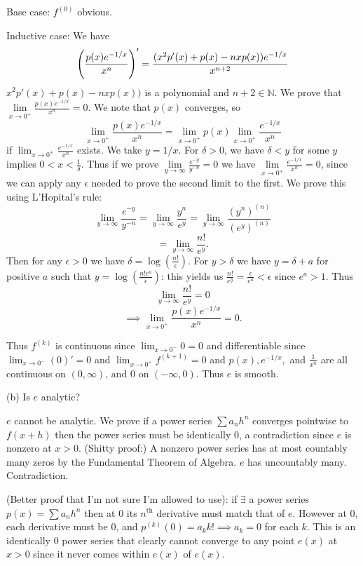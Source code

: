 \documentclass{amsart}
\begin{document}
\medskip \noindent Base case: $f^{(0)}$ obvious.

\medskip \noindent Inductive case: We have 
\[\Bigg{(}\frac{p(x)e^{-1/x}}{x^n}\Bigg{)}' = \frac{(x^2p'(x)+p(x)-nxp(x))e^{-1/x}}{x^{n+2}}\]
$x^2p'(x)+p(x)-nxp(x))$ is a polynomial and $n+2\in \mathbb{N}$. We prove that $\lim\limits_{x\rightarrow 0^+} \frac{p(x)e^{-1/x}}{x^n}=0$. 
We note that $p(x)$ converges, so \[\lim_{x\rightarrow 0^+} \frac{p(x)e^{-1/x}}{x^n}=\lim_{x\rightarrow 0^+}p(x)\lim_{x\rightarrow 0^+}\frac{e^{-1/x}}{x^n}\] if $\lim_{x\rightarrow 0^+}\frac{e^{-1/x}}{x^n}$ exists.
We take $y= 1/x$. For $\delta>0$, we have $\delta<y$ for some $y$ implies
$0<x<\frac{1}{\delta}$. Thus if we prove $\lim\limits_{y\rightarrow\infty}\frac{e^{-y}}{y^{-n}}=0$ we have
$\lim\limits_{x\rightarrow 0^+}\frac{e^{-1/x}}{x^n}=0$, since we can apply any $\epsilon$ needed to prove the second
limit to the first. We prove this using L'Hopital's rule:
\[\lim_{y\rightarrow\infty}\frac{e^{-y}}{y^{-n}}=\lim_{y\rightarrow\infty}\frac{y^n}{e^y}=\lim_{y\rightarrow\infty}\frac{(y^n)^{(n)}}{(e^y)^{(n)}}\]
\[=\lim_{y\rightarrow\infty}\frac{n!}{e^y}.\] Then for any $\epsilon>0$ we have $\delta =\log(\frac{n!}{\epsilon})$. For $y>\delta$ we have $y=\delta+a$ for
positive $a$ such that $y=\log(\frac{n!e^a}{\epsilon})$: this yields us $\frac{n!}{e^y}=\frac{\epsilon}{e^a}<\epsilon$ since $e^a>1$. Thus \[\lim_{y\rightarrow\infty}\frac{n!}{e^y}=0\]
\[\implies \lim_{x\rightarrow 0^+}\frac{p(x)e^{-1/x}}{x^n}=0.\]

\medskip \noindent Thus $f^{(k)}$ is continuous since $\lim_{x\rightarrow 0^-}0 =0$ and differentiable since
$\lim_{x\rightarrow 0^-} (0)'=0$ and $\lim_{x\rightarrow 0^+} f^{(k+1)}=0$ and $p(x), e^{-1/x},$ and $\frac{1}{x^n}$
are all continuous on $(0, \infty)$, and $0$ on $(-\infty, 0)$. Thus $e$ is smooth.


\bigskip

(b) Is $e$ analytic?

\medskip \noindent $e$ cannot be analytic. We prove if a power series $\sum a_nh^n$ converges pointwise to $f(x+h)$ then the power series
must be identically $0$, a contradiction since $e$ is nonzero at $x>0$. (Shitty proof:) A nonzero power series has at most countably many zeros by the Fundamental Theorem of Algebra. $e$ has uncountably many. Contradiction. 

\medskip \noindent (Better proof that I'm not sure I'm allowed to use): if $\exists$ a power series $p(x)=\sum a_nh^n$ then at $0$
its $n^{\text{th}}$ derivative must match that of $e$. However at $0$, each derivative must be $0$, and $p^{(k)}(0)= a_k k!\implies a_k=0$
for each $k$. This is an identically $0$ power series that clearly cannot converge to any point $e(x)$ at $x>0$ since it never
comes within $e(x)$ of $e(x)$. 
\end{document}
